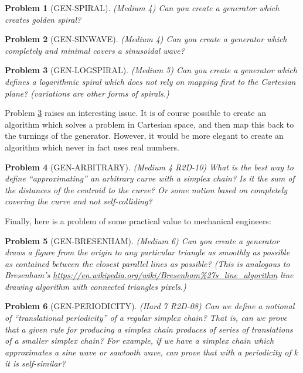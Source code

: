 \documentclass[11pt]{article}
\newtheorem{problem}{Problem}
\begin{document}
\begin{problem}[GEN-SPIRAL]
  (Medium 4) Can you create a generator which creates golden spiral?
\end{problem}
\begin{problem}[GEN-SINWAVE]
  (Medium 4) Can you create a generator which completely and minimal covers a sinusoidal wave?
\end{problem}
\begin{problem}[GEN-LOGSPIRAL]
  \label{probgenlogspiral}
  (Medium 5) Can you create a generator which defines a logarithmic spiral which does not rely on mapping first to the Cartesian plane?
  (variations are other forms of spirals.)
\end{problem}
Problem \ref{probgenlogspiral} raises an interesting issue. It is of course possible to create an algorithm which solves a problem in Cartesian space, and then
map this back to the turnings of the generator. However, it would be more elegant to create an algorithm which never in fact uses real numbers.


\begin{problem}[GEN-ARBITRARY]
(Medium 4 R2D-10) What is the best way to define ``approximating'' an arbitrary  curve with a simplex chain? Is it the sum of the distances of the centroid to the curve?
  Or some notion based on completely covering the curve and not self-colliding?  
\end{problem}

Finally, here is a problem of some practical value to mechanical engineers:
\begin{problem}[GEN-BRESENHAM]
  (Medium 6) Can you create a generator draws a figure from the origin to any particular triangle as smoothly as possible as contained
  between the closest parallel lines as possible? (This is analogous to Bresenham's \url{https://en.wikipedia.org/wiki/Bresenham%27s_line_algorithm}
    line drawing algorithm with connected triangles pixels.)
\end{problem}

\begin{problem}[GEN-PERIODICITY]
(Hard 7 R2D-08) Can we define a notional of ``translational periodicity'' of a regular simplex chain? That is, can we prove that
  a given rule for producing a simplex chain produces of series of translations of a smaller simplex chain? For example,
  if we have a simplex chain which approximates a sine wave or sawtooth wave, can prove that with a periodicity of $k$ it
  is self-similar?  
\end{problem}
\end{document}
